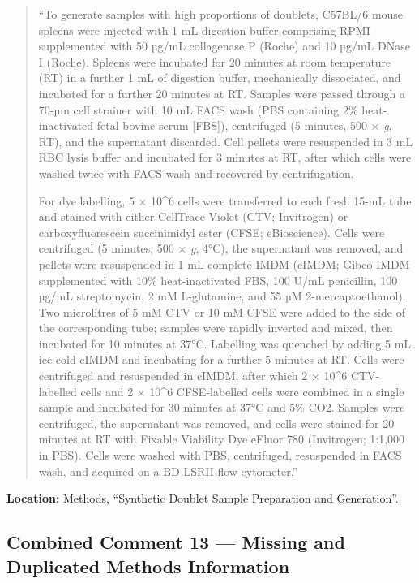 \documentclass[
  11pt,
  a4paper,
]{article}
\begin{document}
\begin{quote}
``To generate samples with high proportions of doublets, C57BL/6 mouse
spleens were injected with 1 mL digestion buffer comprising RPMI
supplemented with 50 µg/mL collagenase P (Roche) and 10 µg/mL DNase I
(Roche). Spleens were incubated for 20 minutes at room temperature (RT)
in a further 1 mL of digestion buffer, mechanically dissociated, and
incubated for a further 20 minutes at RT. Samples were passed through a
70-µm cell strainer with 10 mL FACS wash (PBS containing 2\%
heat-inactivated fetal bovine serum {[}FBS{]}), centrifuged (5 minutes,
500 × \emph{g}, RT), and the supernatant discarded. Cell pellets were
resuspended in 3 mL RBC lysis buffer and incubated for 3 minutes at RT,
after which cells were washed twice with FACS wash and recovered by
centrifugation.

For dye labelling, 5 × 10\^{}6 cells were transferred to each fresh
15-mL tube and stained with either CellTrace Violet (CTV; Invitrogen) or
carboxyfluorescein succinimidyl ester (CFSE; eBioscience). Cells were
centrifuged (5 minutes, 500 × \emph{g}, 4°C), the supernatant was
removed, and pellets were resuspended in 1 mL complete IMDM (cIMDM;
Gibco IMDM supplemented with 10\% heat-inactivated FBS, 100 U/mL
penicillin, 100 µg/mL streptomycin, 2 mM L-glutamine, and 55 µM
2-mercaptoethanol). Two microlitres of 5 mM CTV or 10 mM CFSE were added
to the side of the corresponding tube; samples were rapidly inverted and
mixed, then incubated for 10 minutes at 37°C. Labelling was quenched by
adding 5 mL ice-cold cIMDM and incubating for a further 5 minutes at RT.
Cells were centrifuged and resuspended in cIMDM, after which 2 × 10\^{}6
CTV-labelled cells and 2 × 10\^{}6 CFSE-labelled cells were combined in
a single sample and incubated for 30 minutes at 37°C and 5\% CO2.
Samples were centrifuged, the supernatant was removed, and cells were
stained for 20 minutes at RT with Fixable Viability Dye eFluor 780
(Invitrogen; 1:1,000 in PBS). Cells were washed with PBS, centrifuged,
resuspended in FACS wash, and acquired on a BD LSRII flow cytometer.''
\end{quote}

\textbf{Location:} Methods, ``Synthetic Doublet Sample Preparation and
Generation''.

\subsection{Combined Comment 13 --- Missing and Duplicated Methods
Information}\label{combined-comment-13--missing-and-duplicated-methods-information}
\end{document}

